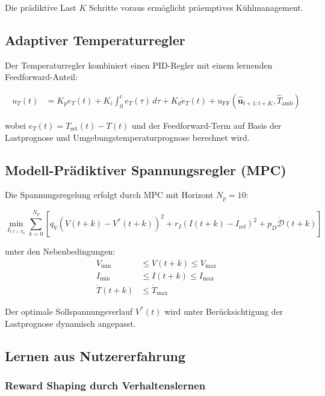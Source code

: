 ﻿\documentclass[12pt,a4paper]{article}
\begin{document}
	Die prädiktive Last $K$ Schritte voraus ermöglicht präemptives Kühlmanagement.
	
	\subsection{Adaptiver Temperaturregler}
	
	Der Temperaturregler kombiniert einen PID-Regler mit einem lernenden Feedforward-Anteil:
	
	\begin{align}
		u_T(t) &= K_p e_T(t) + K_i \int_0^t e_T(\tau)\,d\tau + K_d \dot{e}_T(t)
		+ u_\mathrm{FF}(\hat{\mathbf{u}}_{t+1:t+K}, \hat{T}_\mathrm{amb})
		\label{eq:pid_controller}
	\end{align}
	
	wobei $e_T(t) = T_\mathrm{set}(t) - T(t)$ und der Feedforward-Term auf Basis
	der Lastprognose und Umgebungstemperaturprognose berechnet wird.
	
	\subsection{Modell-Prädiktiver Spannungsregler (MPC)}
	
	Die Spannungsregelung erfolgt durch MPC mit Horizont $N_p = 10$:
	
	\begin{equation}
		\min_{I_{t:t+N_p}} \sum_{k=0}^{N_p} \left[
		q_V (V(t+k) - V^*(t+k))^2 + r_I (I(t+k) - I_\mathrm{ref})^2
		+ p_D \dot{\mathcal{D}}(t+k)
		\right]
		\label{eq:mpc_cost}
	\end{equation}
	
	unter den Nebenbedingungen:
	\begin{align}
		V_\mathrm{min} &\leq V(t+k) \leq V_\mathrm{max} \\
		I_\mathrm{min} &\leq I(t+k) \leq I_\mathrm{max} \\
		\dot{T}(t+k) &\leq \dot{T}_\mathrm{max}
	\end{align}
	
	Der optimale Sollspannungsverlauf $V^*(t)$ wird unter Berücksichtigung der
	Lastprognose dynamisch angepasst.
	
	\subsection{Lernen aus Nutzererfahrung}
	
	\subsubsection{Reward Shaping durch Verhaltenslernen}
	
\end{document}
